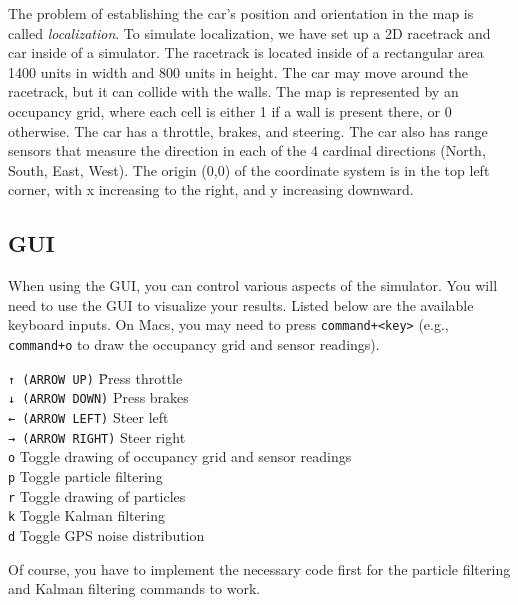 \documentclass[a4paper]{article}
\begin{document}
The problem of establishing the car's position and orientation in the map is called \textit{localization}. To simulate localization, we have set up a 2D racetrack and car inside of a simulator. The racetrack is located inside of a rectangular area 1400 units in width and 800 units in height. The car may move around the racetrack, but it can collide with the walls. The map is represented by an occupancy grid, where each cell is either 1 if a wall is present there, or 0 otherwise. The car has a throttle, brakes, and steering. The car also has range sensors that measure the direction in each of the 4 cardinal directions (North, South, East, West). The origin (0,0) of the coordinate system is in the top left corner, with x increasing to the right, and y increasing downward.

\subsection*{GUI}

When using the GUI, you can control various aspects of the simulator. You will need to use the GUI to visualize your results. Listed below are the available keyboard inputs. On Macs, you may need to press \texttt{command+<key>} (e.g., \texttt{command+o} to draw the occupancy grid and sensor readings).

\begin{tabbing}
    \texttt{↑ (ARROW UP)} \hspace{2em} \= Press throttle \\
    \texttt{↓ (ARROW DOWN)} \> Press brakes\\
    \texttt{← (ARROW LEFT)} \> Steer left\\
    \texttt{→ (ARROW RIGHT)} \> Steer right\\
    \texttt{o} \> Toggle drawing of occupancy grid and sensor readings\\
    \texttt{p} \> Toggle particle filtering\\
    \texttt{r} \> Toggle drawing of particles\\
    \texttt{k} \> Toggle Kalman filtering\\
    \texttt{d} \> Toggle GPS noise distribution\\
\end{tabbing}

\noindent
Of course, you have to implement the necessary code first for the particle filtering and Kalman filtering commands to work.\\
\end{document}
